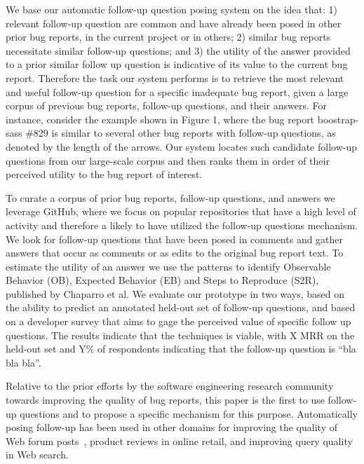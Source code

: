%
We base our automatic follow-up question posing system on the idea that: 1) relevant follow-up question are common and have already been posed in other prior bug reports, in the current project or in others; 2) similar bug reports necessitate similar follow-up questions; and 3) the utility of the answer provided to a prior similar follow up question is indicative of its value to the current bug report.
%
Therefore the task our system performs is to retrieve the most relevant and useful follow-up question for a specific inadequate bug report, given a large corpus of previous bug reports, follow-up questions, and their answers.
%
For instance, consider the example shown in Figure 1, where the bug report boostrap-sass \#829 is similar to several other bug reports with follow-up questions, as denoted by the length of the arrows.
%
Our system locates such candidate follow-up questions from our large-scale corpus and then ranks them in order of their perceived utility to the bug report of interest.

To curate a corpus of prior bug reports, follow-up questions, and answers we leverage GitHub, where we focus on popular repositories that have a high level of activity and therefore a likely to have utilized the follow-up questions mechanism. We look for follow-up questions that have been posed in comments and gather answers that occur as comments or as edits to the original bug report text. To estimate the utility of an answer we use the patterns to identify Observable Behavior (OB), Expected Behavior (EB) and Steps to Reproduce (S2R), published by Chaparro et al. We evaluate our prototype in two ways, based on the ability to predict an annotated held-out set of follow-up questions, and based on a developer survey that aims to gage the perceived value of specific follow up questions. The results indicate that the techniques is viable, with X MRR on the held-out set and Y\% of respondents indicating that the follow-up question is “bla bla bla”.

Relative to the prior efforts by the software engineering research community towards improving the quality of bug reports, this paper is the first to use follow-up questions and to propose a specific mechanism for this purpose. Automatically posing follow-up has been used in other domains for improving the quality of Web forum posts~\cite{rao-daume-iii-2018-learning}, product reviews in online retail, and improving query quality in Web search.

%
